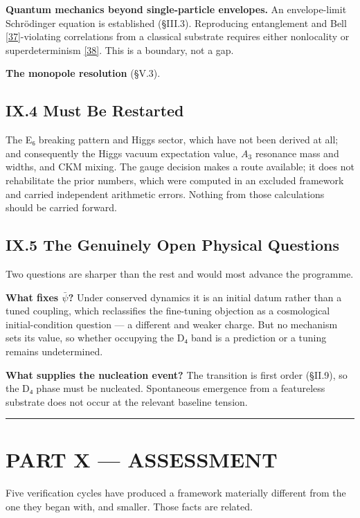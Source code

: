 \documentclass[a4paper,11pt]{article}
\begin{document}
\textbf{Quantum mechanics beyond single-particle envelopes.} An envelope-limit Schrödinger equation is established (§III.3). Reproducing entanglement and Bell \hyperref[ref37]{[37]}-violating correlations from a classical substrate requires either nonlocality or superdeterminism \hyperref[ref38]{[38]}. This is a boundary, not a gap.

\textbf{The monopole resolution} (§V.3).

\subsection*{IX.4 Must Be Restarted}

The E₆ breaking pattern and Higgs sector, which have not been derived at all; and consequently the Higgs vacuum expectation value, $A_3$ resonance mass and widths, and CKM mixing. The gauge decision makes a route available; it does not rehabilitate the prior numbers, which were computed in an excluded framework and carried independent arithmetic errors. Nothing from those calculations should be carried forward.

\subsection*{IX.5 The Genuinely Open Physical Questions}

Two questions are sharper than the rest and would most advance the programme.

\textbf{What fixes $\bar\psi$?} Under conserved dynamics it is an initial datum rather than a tuned coupling, which reclassifies the fine-tuning objection as a cosmological initial-condition question — a different and weaker charge. But no mechanism sets its value, so whether occupying the D₄ band is a prediction or a tuning remains undetermined.

\textbf{What supplies the nucleation event?} The transition is first order (§II.9), so the D₄ phase must be nucleated. Spontaneous emergence from a featureless substrate does not occur at the relevant baseline tension.

\medskip\hrule\medskip

\section*{PART X — ASSESSMENT}

Five verification cycles have produced a framework materially different from the one they began with, and smaller. Those facts are related.
\end{document}
